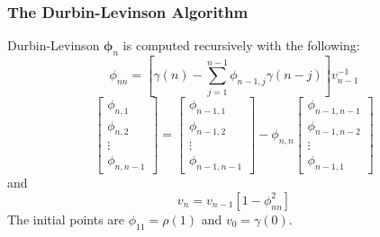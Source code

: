 \documentclass{beamer}
\begin{document}
\begin{frame}
\frametitle{The Durbin-Levinson Algorithm}

\begin{block}{Durbin-Levinson}
$\bm{\phi}_{n}$ is computed recursively with the following:
\[
\phi_{nn} = \left[\gamma(n) - \sum_{j=1}^{n-1}\phi_{n-1,j}\gamma(n-j) \right] v_{n-1}^{-1}
\]
\[
\left[ \begin{array}{c}
\phi_{n,1} \\
\phi_{n,2} \\
\vdots \\
\phi_{n,n-1}
\end{array}\right]
=
\left[ \begin{array}{c}
\phi_{n-1,1} \\
\phi_{n-1,2} \\
\vdots \\
\phi_{n-1,n-1}
\end{array}\right]
- \phi_{n,n}
\left[ \begin{array}{c}
\phi_{n-1,n-1} \\
\phi_{n-1,n-2} \\
\vdots \\
\phi_{n-1,1}
\end{array}\right]
\]
and
\[
v_n = v_{n-1}[1 - \phi_{nn}^2]
\]
The initial points are $\phi_{11} = \rho(1)$ and $v_0 = \gamma(0)$.

\end{block}
\end{frame}


\end{document}
